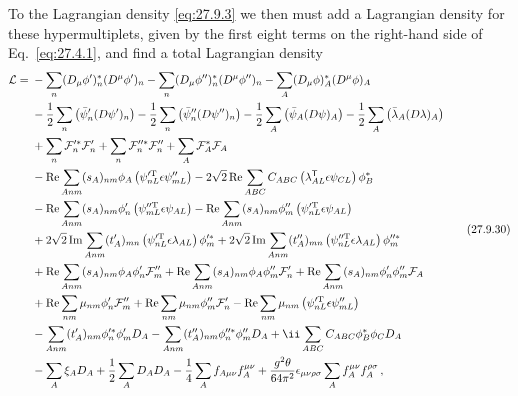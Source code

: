 To the Lagrangian density \eqref{eq:27.9.3} we then must add a Lagrangian
density for these hypermultiplets, given by the first eight terms on the
right-hand side of Eq.~\eqref{eq:27.4.1}, and find a total Lagrangian density
\begin{equation}
  \begin{aligned}
  \mathcal{L}={}&
  -\sum_n(D_\mu\phi')_n^*(D^\mu\phi')_n
  -\sum_n(D_\mu\phi'')_n^*(D^\mu\phi'')_n
  -\sum_A(D_\mu\phi)_A^*(D^\mu\phi)_A
  \\
  &-\frac12\sum_n\left(\bar\psi'_n(\sl{D}\psi')_n\right)
  -\frac12\sum_n\left(\bar\psi''_n(\sl{D}\psi'')_n\right)
  -\frac12\sum_A\left(\bar\psi_A(\sl{D}\psi)_A\right)
  -\frac12\sum_A\left(\bar\lambda_A(\sl{D}\lambda)_A\right)
  \\
  &+\sum_n\mathcal{F}_n^{\prime *}\mathcal{F}'_n
  +\sum_n\mathcal{F}_n^{\prime\prime *}\mathcal{F}''_n
  +\sum_A\mathcal{F}_A^*\mathcal{F}_A
  \\
  &-\operatorname{Re}\sum_{Anm}(s_A)_{nm}\phi_A
    \left(\psi_{nL}^{\prime\mathrm T}\epsilon\psi''_{mL}\right)
  -2\sqrt{2}\operatorname{Re}\sum_{ABC}C_{ABC}
    \left(\lambda_{AL}^{\mathsf T}\epsilon\psi_{CL}\right)\phi_B^*
  \\
  &-\operatorname{Re}\sum_{Anm}(s_A)_{nm}\phi'_n
    \left(\psi_{mL}^{\prime\prime\mathrm T}\epsilon\psi_{AL}\right)
  -\operatorname{Re}\sum_{Anm}(s_A)_{nm}\phi''_m
    \left(\psi_{nL}^{\prime\mathrm T}\epsilon\psi_{AL}\right)
  \\
  &+2\sqrt{2}\operatorname{Im}\sum_{Anm}(t'_A)_{mn}
    \left(\psi_{nL}^{\prime\mathrm T}\epsilon\lambda_{AL}\right)\phi_m^{\prime *}
  +2\sqrt{2}\operatorname{Im}\sum_{Anm}(t''_A)_{mn}
    \left(\psi_{nL}^{\prime\prime\mathrm T}\epsilon\lambda_{AL}\right)
    \phi_m^{\prime\prime *}
  \\
  &+\operatorname{Re}\sum_{Anm}(s_A)_{nm}\phi_A\phi'_n\mathcal{F}''_m
  +\operatorname{Re}\sum_{Anm}(s_A)_{nm}\phi_A\phi''_m\mathcal{F}'_n
  +\operatorname{Re}\sum_{Anm}(s_A)_{nm}\phi'_n\phi''_m\mathcal{F}_A
  \\
  &+\operatorname{Re}\sum_{nm}\mu_{nm}\phi'_n\mathcal{F}''_m
  +\operatorname{Re}\sum_{nm}\mu_{nm}\phi''_m\mathcal{F}'_n
  -\operatorname{Re}\sum_{nm}\mu_{nm}
    \left(\psi_{nL}^{\prime\mathrm T}\epsilon\psi''_{mL}\right)
  \\
  &-\sum_{Anm}(t'_A)_{nm}\phi_n^{\prime *}\phi'_mD_A
  -\sum_{Anm}(t''_A)_{nm}\phi_n^{\prime\prime *}\phi''_mD_A
  +\ii\sum_{ABC}C_{ABC}\phi_B^*\phi_CD_A
  \\
  &-\sum_A\xi_AD_A+\frac12\sum_AD_AD_A
  -\frac14\sum_Af_{A\mu\nu}f_A^{\mu\nu}
  +\frac{g^2\theta}{64\pi^2}\epsilon_{\mu\nu\rho\sigma}
    \sum_Af_A^{\mu\nu}f_A^{\rho\sigma}\,,
  \end{aligned}
  \tag{27.9.30}\label{eq:27.9.30}
\end{equation}
